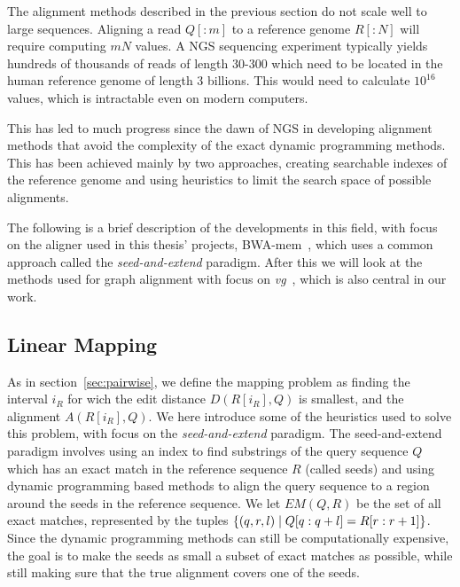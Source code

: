The alignment methods described in the previous section do not scale well to large sequences.
Aligning a read $Q[:m]$ to a reference genome $R[:N]$ will require computing $mN$ values.
A NGS sequencing experiment typically yields hundreds of thousands of reads of length 30-300 which need to be located in the human reference genome of length 3 billions.
This would need to calculate $10^{16}$ values, which is intractable even on modern computers.

This has led to much progress since the dawn of NGS in developing alignment methods that avoid the complexity of the exact dynamic programming methods.
This has been achieved mainly by two approaches, creating searchable indexes of the reference genome and using heuristics to limit the search space of possible alignments.

The following is a brief description of the developments in this field, with focus on the aligner used in this thesis' projects, BWA-mem~\cite{bwamem}, which uses a common approach called the \emph{seed-and-extend} paradigm.
After this we will look at the methods used for graph alignment with focus on \emph{vg}~\cite{vg}, which is also central in our work.

\subsection{Linear Mapping}
As in section~\ref{sec:pairwise}, we define the mapping problem as finding the interval $i_R$ for wich the edit distance $D(R[i_R], Q)$ is smallest, and the alignment $A(R[i_R], Q)$. We here introduce some of the heuristics used to solve this problem, with focus on the \emph{seed-and-extend} paradigm. The seed-and-extend paradigm involves using an index to find substrings of the query sequence $Q$ which has an exact match in the reference sequence $R$ (called seeds) and using dynamic programming based methods to align the query sequence to a region around the seeds in the reference sequence. We let $EM(Q, R)$ be the set of all exact matches, represented by the tuples $\left\{(q, r, l) \mid Q[q:q+l]=R[r:r+1]\right\}$. Since the dynamic programming methods can still be computationally expensive, the goal is to make the seeds as small a subset of exact matches as possible, while still making sure that the true alignment covers one of the seeds.
 
